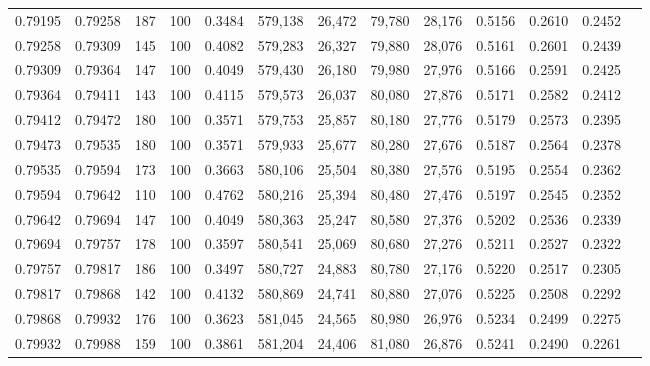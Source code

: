 \begin{tabular}{rrrrrrrrrrrrr}
0.79195 & 0.79258 &   187 & 100 &                                     0.3484 & 579,138 &  26,472 &  79,780 &  28,176 & 0.5156 & 0.2610 & 0.2452 \\
0.79258 & 0.79309 &   145 & 100 &                                     0.4082 & 579,283 &  26,327 &  79,880 &  28,076 & 0.5161 & 0.2601 & 0.2439 \\
0.79309 & 0.79364 &   147 & 100 &                                     0.4049 & 579,430 &  26,180 &  79,980 &  27,976 & 0.5166 & 0.2591 & 0.2425 \\
0.79364 & 0.79411 &   143 & 100 &                                     0.4115 & 579,573 &  26,037 &  80,080 &  27,876 & 0.5171 & 0.2582 & 0.2412 \\
0.79412 & 0.79472 &   180 & 100 &                                     0.3571 & 579,753 &  25,857 &  80,180 &  27,776 & 0.5179 & 0.2573 & 0.2395 \\
0.79473 & 0.79535 &   180 & 100 &                                     0.3571 & 579,933 &  25,677 &  80,280 &  27,676 & 0.5187 & 0.2564 & 0.2378 \\
0.79535 & 0.79594 &   173 & 100 &                                     0.3663 & 580,106 &  25,504 &  80,380 &  27,576 & 0.5195 & 0.2554 & 0.2362 \\
0.79594 & 0.79642 &   110 & 100 &                                     0.4762 & 580,216 &  25,394 &  80,480 &  27,476 & 0.5197 & 0.2545 & 0.2352 \\
0.79642 & 0.79694 &   147 & 100 &                                     0.4049 & 580,363 &  25,247 &  80,580 &  27,376 & 0.5202 & 0.2536 & 0.2339 \\
0.79694 & 0.79757 &   178 & 100 &                                     0.3597 & 580,541 &  25,069 &  80,680 &  27,276 & 0.5211 & 0.2527 & 0.2322 \\
0.79757 & 0.79817 &   186 & 100 &                                     0.3497 & 580,727 &  24,883 &  80,780 &  27,176 & 0.5220 & 0.2517 & 0.2305 \\
0.79817 & 0.79868 &   142 & 100 &                                     0.4132 & 580,869 &  24,741 &  80,880 &  27,076 & 0.5225 & 0.2508 & 0.2292 \\
0.79868 & 0.79932 &   176 & 100 &                                     0.3623 & 581,045 &  24,565 &  80,980 &  26,976 & 0.5234 & 0.2499 & 0.2275 \\
0.79932 & 0.79988 &   159 & 100 &                                     0.3861 & 581,204 &  24,406 &  81,080 &  26,876 & 0.5241 & 0.2490 & 0.2261 \\

\end{tabular}
